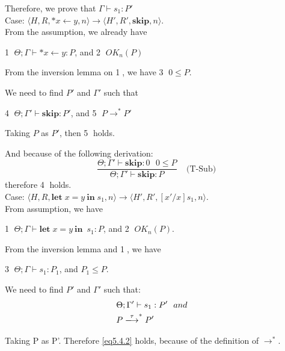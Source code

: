 \documentclass[english]{jssst_ppl} %
\newcommand\LET{\mathbf{let}\;}
\newcommand\IN{\mathbf{in}\;}
\newcommand\SKIP{\mathbf{skip}}
\newcommand\Rtab{\; \; \; \;}
\theoremstyle{definition}
\begin{document}
Therefore, we prove that $\Gamma \vdash s_{1} : P'$ \\

\noindent Case: $\langle H, R, *x \leftarrow y , n \rangle \rightarrow  \langle H', R', \SKIP, n  \rangle $. \\

From the assumption, we already have
\begin{center}
\textcircled{1} $\Theta; \Gamma \vdash *x \leftarrow y : P$, and \textcircled{2} $OK_{n}(P)$
\end{center}

From the inversion lemma on \textcircled{1}, we have \textcircled{3} $0 \le P$.

We need to find $P'$ and $\Gamma'$ such that
\begin{center}
 \textcircled{4} $\Theta; \Gamma' \vdash \SKIP: P'$, and \textcircled{5} $P \rightarrow^{*} P'$
\end{center}

Taking $P$ as $P'$, then \textcircled{5} holds.

And because of the following derivation:
$$
  \frac{\Theta; \Gamma' \vdash \SKIP: 0 \ \ \ 0 \le P}
   {\Theta;\Gamma' \vdash \SKIP : P}
  \Rtab \mbox{(T-Sub)}
$$
therefore \textcircled{4} holds. \\

\noindent Case: $\langle H, R, \LET x = y\  \IN s_{1} , n \rangle \rightarrow  \langle H', R', [x'/x]s_{1}, n  \rangle $. \\

From assumption, we have 
\begin{center}
\textcircled{1} $\Theta; \Gamma \vdash \LET x = y\  \IN \  s_{1} : P$, and \textcircled{2} $OK_{n}(P)$.
\end{center}

From the inversion lemma and \textcircled{1}, we have 
\begin{center}
\textcircled{3} $\Theta; \Gamma \vdash s_{1} : P_{1}$, and $P_{1} \le P$.
\end{center}

We need to find $P'$ and $\Gamma'$ such that:
\begin{align}
  &\Theta; \Gamma' \vdash s_{1} : P' \ \ and& \label{eq5.4.1}\\
  &P \xlongrightarrow{\tau}^{*} P'& \label{eq5.4.2}
\end{align}

Taking P as P'. Therefore \eqref{eq5.4.2} holds, because of the definition of $\rightarrow^{*}$.
\end{document}
